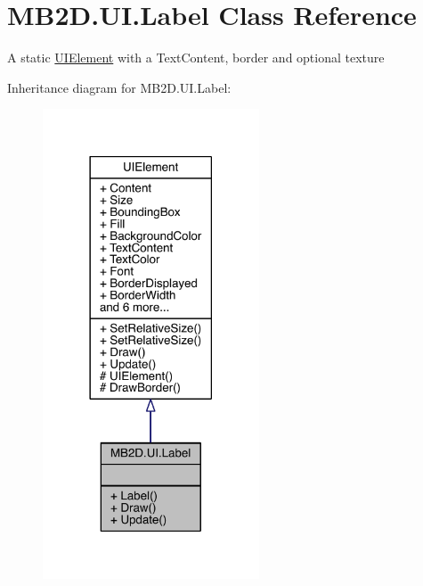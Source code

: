\hypertarget{class_m_b2_d_1_1_u_i_1_1_label}{}\section{M\+B2\+D.\+U\+I.\+Label Class Reference}
\label{class_m_b2_d_1_1_u_i_1_1_label}


A static \hyperlink{class_m_b2_d_1_1_u_i_1_1_u_i_element}{U\+I\+Element} with a Text\+Content, border and optional texture  




Inheritance diagram for M\+B2\+D.\+U\+I.\+Label\+:\nopagebreak
\begin{figure}[H]
\begin{center}
\leavevmode
\includegraphics[width=182pt]{class_m_b2_d_1_1_u_i_1_1_label__inherit__graph}
\end{center}
\end{figure}


